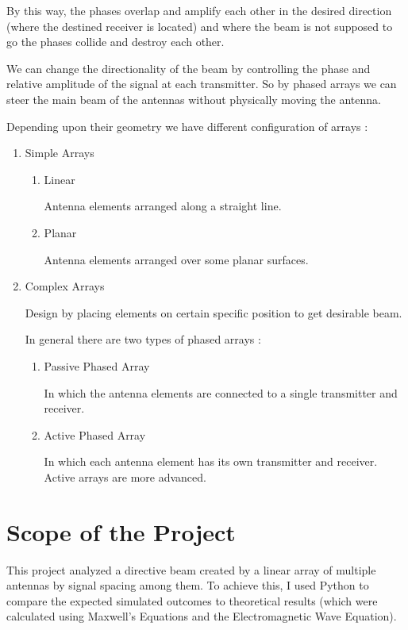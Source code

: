By this way, the phases overlap and amplify each other in the desired direction (where the destined receiver is located) and where the beam is not supposed to go the phases collide and destroy each other.

We can change the directionality of the beam by controlling the phase and relative amplitude of the signal at each transmitter. So by phased arrays we can steer the main beam of the antennas without physically moving the antenna.

Depending upon their geometry we have different configuration of arrays \cite{mailloux2005phased}:

\begin{enumerate}

   \item Simple Arrays
      \begin{enumerate}

         \item Linear

            Antenna elements arranged along a straight line.

         \item Planar

            Antenna elements arranged over some planar surfaces.

      \end{enumerate}


   \item Complex Arrays

      Design by placing elements on certain specific position to get desirable beam.
      
      In general there are two types of phased arrays \cite{hines1978phased}:

      \begin{enumerate}

         \item Passive Phased Array

            In which the antenna elements are connected to a single transmitter and receiver.

         \item Active Phased Array

            In which each antenna element has its own transmitter and receiver. Active arrays are more advanced.

      \end{enumerate}

\end{enumerate}

\section{Scope of the Project}

This project analyzed a directive beam created by a linear array of multiple antennas by signal spacing among them. 
To achieve this, I used Python to compare the expected simulated outcomes to theoretical results (which were calculated using Maxwell's Equations and the Electromagnetic Wave Equation).
